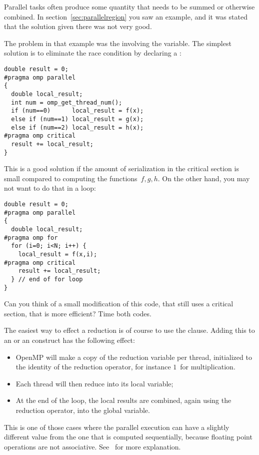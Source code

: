 
\label{sec:reduction}

Parallel tasks often produce some quantity that needs to be summed
or otherwise combined.
In section~\ref{sec:parallelregion} you saw an example, and it was stated that the
solution given there was not very good.

The problem in that example was the  involving the 
variable. The simplest solution is to eliminate the race condition
by declaring a :
\begin{lstlisting}
double result = 0;
#pragma omp parallel
{
  double local_result;
  int num = omp_get_thread_num();
  if (num==0)      local_result = f(x);
  else if (num==1) local_result = g(x);
  else if (num==2) local_result = h(x);
#pragma omp critical
  result += local_result;
}
\end{lstlisting}

This is a good solution if the amount of serialization in the critical section
is small compared to computing the functions~$f,g,h$. On the other hand, you
may not want to do that in a loop:
\begin{lstlisting}
double result = 0;
#pragma omp parallel
{
  double local_result;
#pragma omp for
  for (i=0; i<N; i++) {
    local_result = f(x,i);
#pragma omp critical
    result += local_result;
  } // end of for loop
}
\end{lstlisting}
\begin{exercise}
  Can you think of a small modification of this code, that still uses a critical section,
  that is more efficient? Time both codes.
\end{exercise}

The easiest way to effect a reduction is of course to use the 
clause. Adding this to an  or an  construct
has the following effect:
\begin{itemize}
\item OpenMP will make a copy of the reduction variable per thread,
  initialized to the identity of the reduction operator, for instance
  $1$~for multiplication.
\item Each thread will then reduce into its local variable;
\item At the end of the loop, the local results are combined, again
  using the reduction operator, into the global variable.
\end{itemize}
This is one of those cases where the parallel execution can have a slightly different
value from the one that is computed sequentially, because floating point operations
are not associative. See~ for more explanation.

